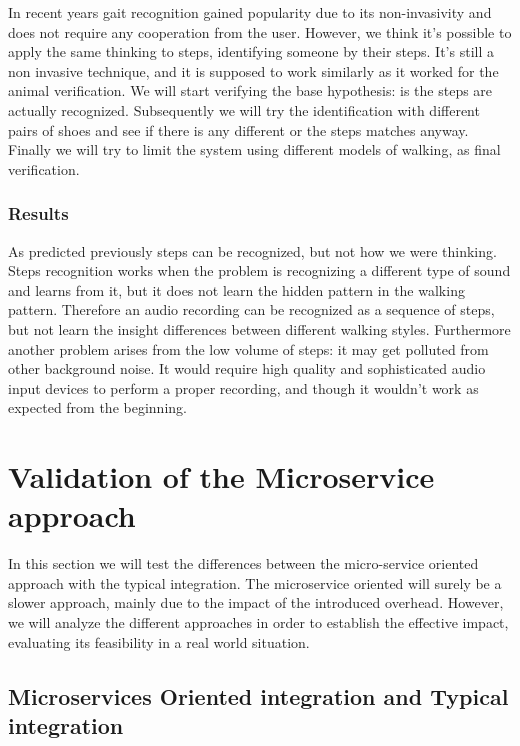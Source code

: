 In recent years gait recognition gained popularity due to its
non-invasivity and does not require any cooperation from the user.
However, we think it's possible to apply the same thinking to steps,
identifying someone by their steps. It's still a non invasive technique,
and it is supposed to work similarly as it worked for the animal verification.
We will start verifying the base hypothesis: is the steps are actually recognized.
Subsequently we will try the identification with different pairs of shoes and see if
there is any different or the steps matches anyway. Finally we will try to limit the system
using different models of walking, as final verification.

\subsubsection{Results}

As predicted previously steps can be recognized, but not how we were thinking.
Steps recognition works when the problem is recognizing a different type of sound and learns from it,
but it does not learn the hidden pattern in the walking pattern. Therefore an audio recording can be
recognized as a sequence of steps, but not learn the insight differences between different walking
styles.\newline
Furthermore another problem arises from the low volume of steps: it may get polluted from other background noise.
It would require high quality and sophisticated audio input devices to perform a proper recording,
and though it wouldn't work as expected from the beginning.

\section{Validation of the Microservice approach}

In this section we will test the differences between the micro-service
oriented approach with the typical integration. The microservice oriented
will surely be a slower approach, mainly due to the impact of the introduced
overhead. However, we will analyze the different approaches in order to establish
the effective impact, evaluating its feasibility in a real world situation.



\subsection{Microservices Oriented integration and Typical integration}

